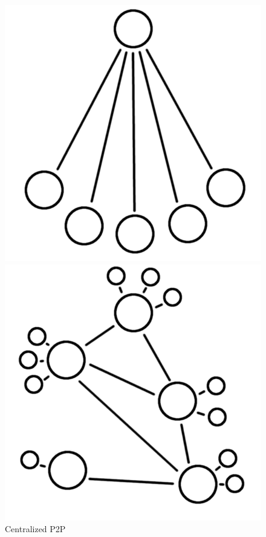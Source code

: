 \begin{figure}
	\begin{minipage}{.5\linewidth}
		\centering
		\includegraphics[scale=0.2]{Talk5/centralized_p2p.PNG}
		\caption{Centralized P2P}
		\label{centralized_p2p}
	\end{minipage}%
	\begin{minipage}{.5\linewidth}
		\centering
		\includegraphics[scale=0.2]{Talk5/hybrid_p2p.PNG}

\end{minipage}
\end{figure}
